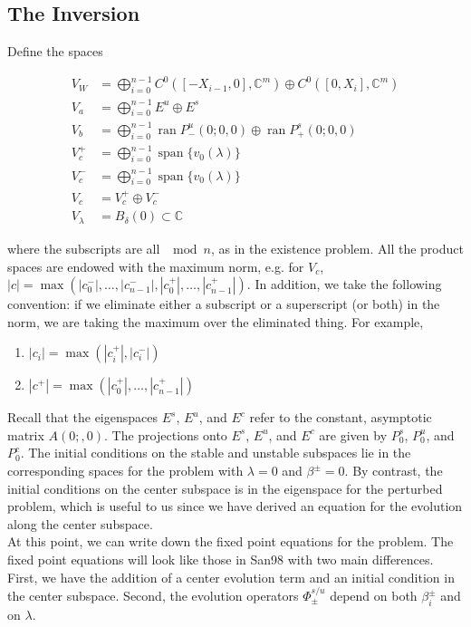 \documentclass[12pt]{article}
\def\C{{\mathbb C}}
\DeclareMathOperator{\spn}{span}
\DeclareMathOperator{\ran}{ran}
\begin{document}
\subsection{The Inversion}

Define the spaces

\begin{align*}
V_W &= \bigoplus_{i=0}^{n-1} C^0([-X_{i-1}, 0], \C^m) \oplus C^0([0, X_i], \C^m) \\
V_a &= \bigoplus_{i=0}^{n-1} E^u \oplus E^s\\
V_b &= \bigoplus_{i=0}^{n-1} \ran P^u_-(0; 0, 0) \oplus \ran P^s_+(0; 0, 0) \\
V_c^+ &= \bigoplus_{i=0}^{n-1} \spn \{v_0(\lambda)\} \\
V_c^- &= \bigoplus_{i=0}^{n-1} \spn \{v_0(\lambda)\} \\
V_c &= V_c^+ \oplus V_c^- \\
V_\lambda &= B_\delta(0) \subset \C
\end{align*}

where the subscripts are all $\mod n$, as in the existence problem. All the product spaces are endowed with the maximum norm, e.g. for $V_c$, $|c| = \max(|c_0^-|, \dots, |c_{n-1}^-|, |c_0^+|, \dots, |c_{n-1}^+|)$. In addition, we take the following convention: if we eliminate either a subscript or a superscript (or both) in the norm, we are taking the maximum over the eliminated thing. For example,
\begin{enumerate}
	\item $|c_i| = \max(|c_i^+|, |c_i^-|)$ 
	\item $|c^+| = \max(|c_0^+|, \dots, |c_{n-1}^+|)$
\end{enumerate} 

Recall that the eigenspaces $E^s$, $E^u$, and $E^c$ refer to the constant, asymptotic matrix $A(0;, 0)$. The projections onto $E^s$, $E^u$, and $E^c$ are given by $P_0^s$, $P_0^u$, and $P_0^c$. The initial conditions on the stable and unstable subspaces lie in the corresponding spaces for the problem with $\lambda = 0$ and $\beta^\pm = 0$. By contrast, the initial conditions on the center subspace is in the eigenspace for the perturbed problem, which is useful to us since we have derived an equation for the evolution along the center subspace.\\

At this point, we can write down the fixed point equations for the problem. The fixed point equations will look like those in San98 with two main differences. First, we have the addition of a center evolution term and an initial condition in the center subspace. Second, the evolution operators $\Phi^{s/u}_\pm$ depend on both $\beta_i^\pm$ and on $\lambda$.\\
\end{document}
